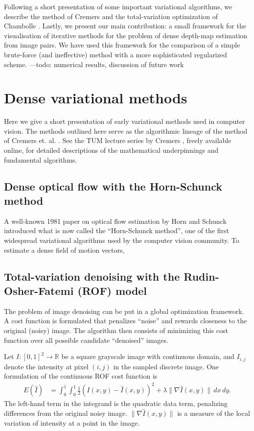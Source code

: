 \documentclass[conference]{IEEEtran}
\begin{document}
Following a short presentation of some important variational algorithms, we describe the method of Cremers
\cite{dense_geometry} and the total-variation optimization of Chambolle \cite{chambolle}.
Lastly, we present our main contribution: a small framework for the visualisation of iterative methods for the problem of
dense depth-map estimation from image pairs. We have used this framework for the comparison of a simple brute-force 
(and ineffective) method with a more sophisticated regularized scheme. ---todo: numerical results, discussion of future work

\section{Dense variational methods}
Here we give a short presentation of early variational methods used in computer vision.
The methods outlined here serve as the algorithmic lineage of the method of Cremers et. al. \cite{dense_geometry}.
See the TUM lecture series by Cremers \cite{variational_lectures}, freely available online, for detailed descriptions of the mathematical underpinnings
and fundamental algorithms.

\subsection{Dense optical flow with the Horn-Schunck method}
A well-known 1981 paper on optical flow estimation by Horn and Schunck \cite{horn_schunck} introduced what is now called the ``Horn-Schunck method'', one of the
first widespread variational algorithms used by the computer vision community.
To estimate a dense field of motion vectors,

\subsection{Total-variation denoising with the Rudin-Osher-Fatemi (ROF) model}
The problem of image denoising can be put in a global optimization
framework. A cost function is formulated that penalizes ``noise'' and rewards closeness to the original (noisy) image. The algorithm then
consists of minimizing this cost function over all possible candidate ``denoised'' images.

Let $I:[0,1]^2 \rightarrow \mathbb{R}$ be a square grayscale image with continuous domain, and
$I_{i,j}$ denote the intensity at pixel $(i, j)$ in the sampled discrete image.
One formulation of the continuous ROF cost function is
\begin{equation}\label{rof_continuous}
\begin{split}
    E(\hat{I}) &= \int_0^1\int_0^1 \frac{1}{2} \left(I(x,y) - \hat{I}(x,y)\right)^2 + \lambda \|\nabla \hat{I}(x,y)\| \,dx \,dy.
\end{split}
\end{equation}
The left-hand term in the integrand is the quadratic data term, penalizing differences from the original noisy image.
$\|\nabla \hat{I}(x,y)\|$ is a measure of the local variation of intensity at a point in the image.
\end{document}
